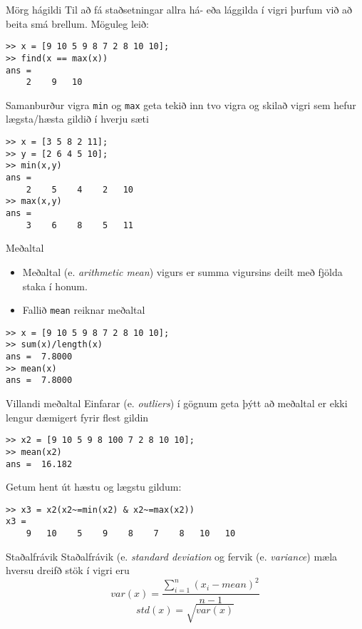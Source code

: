 \documentclass[handout]{beamer}
\begin{document}
\begin{frame}[fragile]{Mörg hágildi}
Til að fá staðsetningar allra há- eða lággilda í vigri þurfum við að beita smá brellum. \pause
Möguleg leið:
\begin{verbatim}
>> x = [9 10 5 9 8 7 2 8 10 10];
>> find(x == max(x))
ans =
    2    9   10
\end{verbatim}
\end{frame}

\begin{frame}[fragile]{Samanburður vigra}
\texttt{min} og \texttt{max} geta tekið inn tvo vigra og skilað vigri sem hefur lægsta/hæsta gildið í hverju sæti
\begin{verbatim}
>> x = [3 5 8 2 11];
>> y = [2 6 4 5 10];
>> min(x,y)
ans =
    2    5    4    2   10
>> max(x,y)
ans =
    3    6    8    5   11
\end{verbatim}
\end{frame}

\begin{frame}[fragile]{Meðaltal}
\begin{itemize}
 \item Meðaltal (e. \emph{arithmetic mean}) vigurs er summa vigursins deilt með fjölda staka í honum.
 \item Fallið \texttt{mean} reiknar meðaltal
\end{itemize}
\begin{verbatim}
>> x = [9 10 5 9 8 7 2 8 10 10];
>> sum(x)/length(x)
ans =  7.8000
>> mean(x)
ans =  7.8000
\end{verbatim}
\end{frame}

\begin{frame}[fragile]{Villandi meðaltal}
Einfarar (e. \emph{outliers}) í gögnum geta þýtt að meðaltal er ekki lengur dæmigert fyrir flest gildin
\begin{verbatim}
>> x2 = [9 10 5 9 8 100 7 2 8 10 10];
>> mean(x2)
ans =  16.182
\end{verbatim}
Getum hent út hæstu og lægstu gildum:
\begin{verbatim}
>> x3 = x2(x2~=min(x2) & x2~=max(x2))
x3 =
    9   10    5    9    8    7    8   10   10
\end{verbatim}
\end{frame}

\begin{frame}{Staðalfrávik}
Staðalfrávik (e. \emph{standard deviation} og fervik (e. \emph{variance}) mæla hversu dreifð stök í vigri eru
\[
 var(x) = \frac{\sum_{i=1}^n (x_i - mean)^2}{n-1}
\]
\[
  std(x) = \sqrt{var(x)}
\]
\end{frame}
\end{document}
